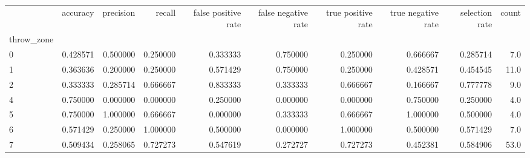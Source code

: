 \begin{tabular}{lrrrrrrrrr}
\toprule
{} &  accuracy &  precision &    recall &  false positive rate &  false negative rate &  true positive rate &  true negative rate &  selection rate &  count \\
throw\_zone &           &            &           &                      &                      &                     &                     &                 &        \\
\midrule
0          &  0.428571 &   0.500000 &  0.250000 &             0.333333 &             0.750000 &            0.250000 &            0.666667 &        0.285714 &    7.0 \\
1          &  0.363636 &   0.200000 &  0.250000 &             0.571429 &             0.750000 &            0.250000 &            0.428571 &        0.454545 &   11.0 \\
2          &  0.333333 &   0.285714 &  0.666667 &             0.833333 &             0.333333 &            0.666667 &            0.166667 &        0.777778 &    9.0 \\
4          &  0.750000 &   0.000000 &  0.000000 &             0.250000 &             0.000000 &            0.000000 &            0.750000 &        0.250000 &    4.0 \\
5          &  0.750000 &   1.000000 &  0.666667 &             0.000000 &             0.333333 &            0.666667 &            1.000000 &        0.500000 &    4.0 \\
6          &  0.571429 &   0.250000 &  1.000000 &             0.500000 &             0.000000 &            1.000000 &            0.500000 &        0.571429 &    7.0 \\
7          &  0.509434 &   0.258065 &  0.727273 &             0.547619 &             0.272727 &            0.727273 &            0.452381 &        0.584906 &   53.0 \\
\bottomrule
\end{tabular}
